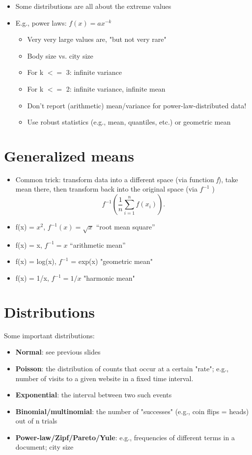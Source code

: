 \documentclass[11pt]{article}
\begin{document}
\begin{itemize}
	\item Some distributions are all about the extreme values
	\item E.g., power laws: $f(x) = ax^{-k}$ 
	\begin{itemize}
		\item Very very large values are, "but not very rare"
		\item Body size vs. city size
		\item For k $<=$ 3: infinite variance
		\item For k $<=$ 2: infinite variance, infinite mean
		\item Don't report (arithmetic) mean/variance for power-law-distributed data!
		\item Use robust statistics (e.g., mean, quantiles, etc.) or geometric mean
	\end{itemize}
\end{itemize}

\section*{Generalized means}
\begin{itemize}
	\item Common trick: transform data into a different space (via function \textit{f}), take mean there, then transform back into the original space (via $f^{-1}$ )
\[
	f^{-1}(\frac{1}{n} \sum_{i=1}^{n}{f(x_i)})
.\] 		
\end{itemize}

\begin{itemize}
	\item f(x) = $x^{2}$, $f^{-1}(x) = \sqrt{x}$  “root mean square”
	\item f(x) = x, $f^{-1} = x$ “arithmetic mean”
	\item f(x) = log(x), $f^{-1}$ = exp(x) "geometric mean"
	\item f(x) = 1/x, $f^{-1} = 1/x$ "harmonic mean"
\end{itemize}

\section*{Distributions}

Some important distributions:
\begin{itemize}
	\item \textbf{Normal}: see previous slides
	\item \textbf{Poisson}: the distribution of counts that occur at a certain "rate"; e.g., number of visits to a given website in a fixed time interval. 
	\item \textbf{Exponential}: the interval between two such events
	\item \textbf{Binomial/multinomial}: the number of "successes" (e.g., coin flips = heads) out of n trials
	\item \textbf{Power-law/Zipf/Pareto/Yule}: e.g., frequencies of different terms in a document; city size
\end{itemize}
\end{document}
